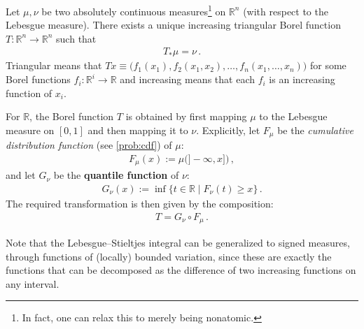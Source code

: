     \begin{property}
        Let $\mu,\nu$ be two absolutely continuous measures\footnote{In fact, one can relax this to merely being nonatomic.} on $\mathbb{R}^n$ (with respect to the Lebesgue measure). There exists a unique increasing triangular Borel function $T:\mathbb{R}^n\rightarrow\mathbb{R}^n$ such that
        \begin{gather}
            T_\ast\mu = \nu\,.
        \end{gather}
        Triangular means that $Tx\equiv\bigl(f_1(x_1),f_2(x_1,x_2),\ldots,f_n(x_1,\ldots,x_n)\bigr)$ for some Borel functions $f_i:\mathbb{R}^i\rightarrow\mathbb{R}$ and increasing means that each $f_i$ is an increasing function of $x_i$.
    \end{property}
    \begin{remark}
        For $\mathbb{R}$, the Borel function $T$ is obtained by first mapping $\mu$ to the Lebesgue measure on $[0,1]$ and then mapping it to $\nu$. Explicitly, let $F_\mu$ be the \textit{cumulative distribution function} (see \cref{prob:cdf}) of $\mu$:
        \begin{gather}
            F_\mu(x) := \mu\bigl(]-\infty,x]\bigr)\,,
        \end{gather}
        and let $G_\nu$ be the \textbf{quantile function} of $\nu$:
        \begin{gather}
            G_\nu(x) := \inf\{t\in\mathbb{R}\mid F_\nu(t)\geq x\}\,.
        \end{gather}
        The required transformation is then given by the composition:
        \begin{gather}
            T = G_\nu\circ F_\mu\,.
        \end{gather}

    \end{remark}

    \begin{remark}\label{measure:bounded_variation_integral}
        Note that the Lebesgue--Stieltjes integral can be generalized to signed measures, through functions of (locally) bounded variation, since these are exactly the functions that can be decomposed as the difference of two increasing functions on any interval.
    \end{remark}
    
